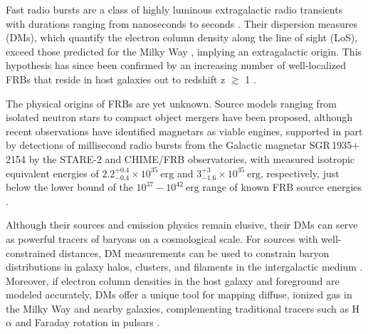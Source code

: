 \documentclass[twocolumn, linenumbers, tra]{aastex631}
\begin{document}
Fast radio bursts \citep[FRBs;][]{Lorimer2007} are a class of highly luminous extragalactic radio transients with durations ranging from nanoseconds to seconds \citep{Petroff2019, Cordes2019, Majid2021, Nimmo2022, chime2022}. Their dispersion measures (DMs), which quantify the electron column density along the line of sight (LoS), exceed those predicted for the Milky Way \citep{Cordes2002, Yao2017}, implying an extragalactic origin. This hypothesis has since been confirmed by an increasing number of well-localized FRBs that reside in host galaxies out to redshift z $\gtrsim$ 1 \citep{Ryder2023, Law2023, Gordon2023, Connor2024}.

The physical origins of FRBs are yet unknown. Source models ranging from isolated neutron stars to compact object mergers have been proposed, although recent observations have identified magnetars as viable engines, supported in part by detections of millisecond radio bursts from the Galactic magnetar SGR\,1935$+$2154 by the STARE-2 and CHIME/FRB observatories, with measured isotropic equivalent energies of $2.2^{+0.4}_{-0.4} \times 10^{35} \ \mathrm{erg}$ and $3_{-1.6}^{+3} \times 10^{35} \ \mathrm{erg}$, respectively, just below the lower bound of the $10^{37}-10^{42}\ \mathrm{erg}$ range of known FRB source energies \citep{Bochenek2020, chime2020b}.

Although their sources and emission physics remain elusive, their DMs can serve as powerful tracers of baryons on a cosmological scale. For sources with well-constrained distances, DM measurements can be used to constrain baryon distributions in galaxy halos, clusters, and filaments in the intergalactic medium \citep{McQuinn2014, Macquart2020, Shin2024, Connor2024}. Moreover, if electron column densities in the host galaxy and foreground are modeled accurately, DMs offer a unique tool for mapping diffuse, ionized gas in the Milky Way and nearby galaxies, complementing traditional tracers such as H$\alpha$ and Faraday rotation in pulsars \citep{Connor2022, Ravi2023a, Cook2023}.
\end{document}
